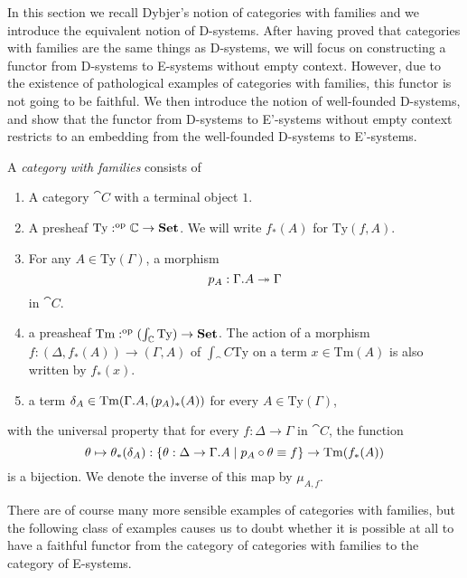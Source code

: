 In this section we recall Dybjer's notion of categories with families and we
introduce the equivalent notion of D-systems. After having proved that categories with families
are the same things as D-systems, we will focus on constructing a functor from
D-systems to E-systems without empty context. However, due to the existence of pathological examples
of categories with families, this functor is not going to be faithful. We then
introduce the notion of well-founded D-systems, and show that the
functor from D-systems to E'-systems without empty context restricts to an
embedding from the well-founded D-systems to E'-systems. 

\begin{defn}
A \emph{category with families} consists of
\begin{enumerate}
\item A category $\cat{C}$ with a terminal object $1$.
\item A presheaf $\mathrm{Ty}:^{\mathrm{op}}{\mathbb{C}}\to\mathbf{Set}$. We will write
$f_\ast(A)$ for $\mathrm{Ty}(f,A)$.
\item For any $A\in\mathrm{Ty}(\Gamma)$, a morphism
\begin{equation*}
p_A : \ctxext{\Gamma}{A}\twoheadrightarrow \Gamma
\end{equation*}
in $\cat{C}$.
\item a preasheaf $\mathrm{Tm}:^{\mathrm{op}}{(\int_\mathbb{C}\mathrm{Ty})}\to\mathbf{Set}$.
The action of a morphism $f:(\Delta,f_\ast(A))\to(\Gamma,A)$ of $\int_\cat{C}\mathrm{Ty}$
on a term $x\in \mathrm{Tm}(A)$ is also written by $f_\ast(x)$.
\item a term $\delta_A\in\mathrm{Tm}(\ctxext{\Gamma}{A},(p_A)_\ast(A))$ for every
$A\in\mathrm{Ty}(\Gamma)$, 
\end{enumerate}
with the universal property that for every $f:\Delta\to\Gamma$ in $\cat{C}$, 
the function
\begin{equation*}
\theta\mapsto\theta_\ast(\delta_A)
  : \{\theta:\Delta\to\ctxext{\Gamma}{A}\mid p_A\circ\theta\jdeq f\}\to
    \mathrm{Tm}(f_\ast(A))
\end{equation*}
is a bijection. We denote the inverse of this map by $\mu_{A,f}$. 
\end{defn}

There are of course many more sensible examples of categories with families,
but the following class of examples causes us to doubt whether it is possible
at all to have a faithful functor from the category of categories
with families to the category of E-systems. 

